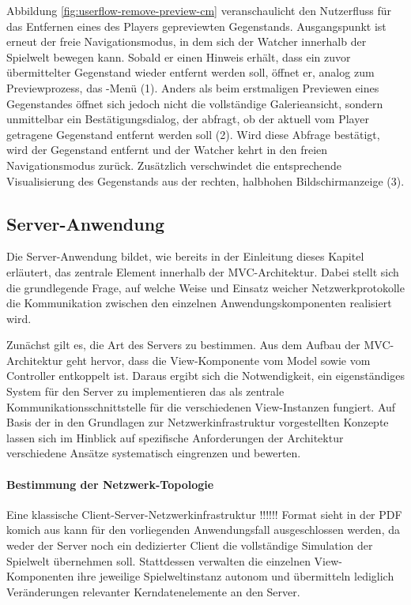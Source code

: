 Abbildung \ref{fig:userflow-remove-preview-cm} veranschaulicht den Nutzerfluss für das Entfernen eines des Players gepreviewten Gegenstands. Ausgangspunkt ist erneut der freie Navigationsmodus, in dem sich der Watcher innerhalb der Spielwelt bewegen kann. Sobald er einen Hinweis erhält, dass ein zuvor übermittelter Gegenstand wieder entfernt werden soll, öffnet er, analog zum Previewprozess, das -Menü (1). Anders als beim erstmaligen Previewen eines Gegenstandes öffnet sich jedoch nicht die vollständige Galerieansicht, sondern unmittelbar ein Bestätigungsdialog, der abfragt, ob der aktuell vom Player getragene Gegenstand entfernt werden soll (2). Wird diese Abfrage bestätigt, wird der Gegenstand entfernt und der Watcher kehrt in den freien Navigationsmodus zurück. Zusätzlich verschwindet die entsprechende Visualisierung des Gegenstands aus der rechten, halbhohen Bildschirmanzeige (3). 

\subsection{Server-Anwendung}

Die Server-Anwendung bildet, wie bereits in der Einleitung dieses Kapitel erläutert, das zentrale Element innerhalb der \ac{MVC}-Architektur. Dabei stellt sich die grundlegende Frage, auf welche Weise und Einsatz weicher Netzwerkprotokolle die Kommunikation zwischen den einzelnen Anwendungskomponenten realisiert wird.

Zunächst gilt es, die Art des Servers zu bestimmen. Aus dem Aufbau der \ac{MVC}-Architektur geht hervor, dass die View-Komponente vom Model sowie vom Controller entkoppelt ist. Daraus ergibt sich die Notwendigkeit, ein eigenständiges System für den Server zu implementieren das als zentrale Kommunikationsschnittstelle für die verschiedenen View-Instanzen fungiert. Auf Basis der in den Grundlagen zur Netzwerkinfrastruktur vorgestellten Konzepte lassen sich im Hinblick auf spezifische Anforderungen der Architektur verschiedene Ansätze systematisch eingrenzen und bewerten.

\paragraph{Bestimmung der Netzwerk-Topologie}

Eine klassische Client-Server-Netzwerkinfrastruktur !!!!!! Format sieht in der PDF komich aus kann für den vorliegenden Anwendungsfall ausgeschlossen werden, da weder der Server noch ein dedizierter Client die vollständige Simulation der Spielwelt übernehmen soll. Stattdessen verwalten die einzelnen View-Komponenten ihre jeweilige Spielweltinstanz autonom und übermitteln lediglich Veränderungen relevanter Kerndatenelemente an den Server.

